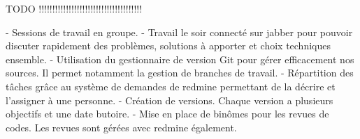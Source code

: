 TODO !!!!!!!!!!!!!!!!!!!!!!!!!!!!!!!!!!!!!!

- Sessions de travail en groupe.
- Travail le soir connecté sur jabber pour pouvoir discuter rapidement des problèmes, solutions à apporter et choix techniques ensemble.
- Utilisation du gestionnaire de version Git pour gérer efficacement nos sources. Il permet notamment la gestion de branches de travail.
- Répartition des tâches grâce au système de demandes de redmine permettant de la décrire et l'assigner à une personne.
- Création de versions. Chaque version a plusieurs objectifs et une date butoire.
- Mise en place de binômes pour les revues de codes. Les revues sont gérées avec redmine également.